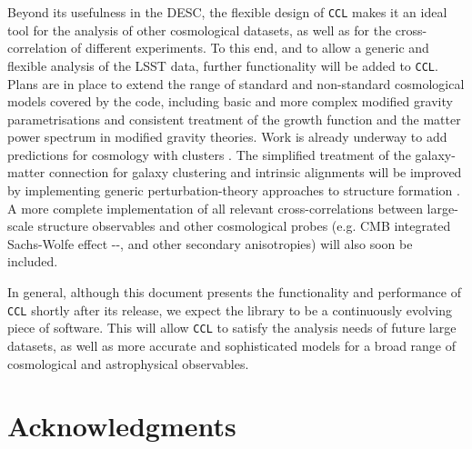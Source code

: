 \documentclass[\docopts]{\docclass}
\newcommand{\ccl}{{\tt CCL}\xspace}
\begin{document}
Beyond its usefulness in the DESC, the flexible design of \ccl makes it an ideal tool for the analysis of other cosmological datasets, as well as for the cross-correlation of different experiments. To this end, and to allow a generic and flexible analysis of the LSST data, further functionality will be added to \ccl. Plans are in place to extend the range of standard and non-standard cosmological models covered by the code, including basic and more complex modified gravity parametrisations \citep{Silvestri2013, Bellini2014} and consistent treatment of the growth function and the matter power spectrum in modified gravity theories. Work is already underway to add predictions for cosmology with clusters \citep{McClintock18}. The simplified treatment of the galaxy-matter connection for galaxy clustering and intrinsic alignments will be improved by implementing generic perturbation-theory approaches to structure formation \citep{FASTPT}. A more complete implementation of all relevant cross-correlations between large-scale structure observables and other cosmological probes (e.g. CMB integrated Sachs-Wolfe effect -\citealt{1967ApJ...147...73S}-, and other secondary anisotropies) will also soon be included. 

In general, although this document presents the functionality and performance of \ccl shortly after its release, we expect the library to be a continuously evolving piece of software. This will allow \ccl to satisfy the analysis needs of future large datasets, as well as more accurate and sophisticated models for a broad range of cosmological and astrophysical observables.

\section*{Acknowledgments}

\vskip 5pt


\vskip 5pt



\end{document}
